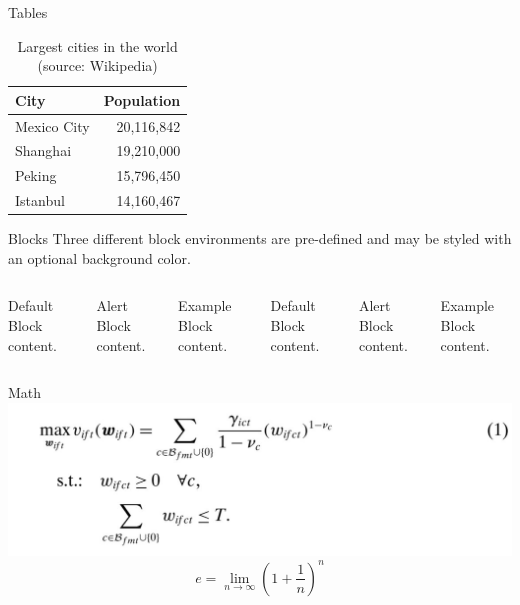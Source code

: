 \documentclass[10pt]{beamer}
\begin{document}
\begin{frame}{Tables}
  \begin{table}
    \caption{Largest cities in the world (source: Wikipedia)}
    \begin{tabular}{lr}
      \toprule
      City & Population\\
      \midrule
      Mexico City & 20,116,842\\
      Shanghai & 19,210,000\\
      Peking & 15,796,450\\
      Istanbul & 14,160,467\\
      \bottomrule
    \end{tabular}
  \end{table}
\end{frame}
\begin{frame}{Blocks}
  Three different block environments are pre-defined and may be styled with an
  optional background color.

  \begin{columns}[T,onlytextwidth]
      \begin{block}{Default}
        Block content.
      \end{block}

      \begin{alertblock}{Alert}
        Block content.
      \end{alertblock}

      \begin{exampleblock}{Example}
        Block content.
      \end{exampleblock}



      \begin{block}{Default}
        Block content.
      \end{block}

      \begin{alertblock}{Alert}
        Block content.
      \end{alertblock}

      \begin{exampleblock}{Example}
        Block content.
      \end{exampleblock}

  \end{columns}
\end{frame}
\begin{frame}{Math}
\includegraphics[width=\textwidth]{1}
  \begin{equation*}
    e = \lim_{n\to \infty} \left(1 + \frac{1}{n}\right)^n
  \end{equation*}
\end{frame}
\end{document}
